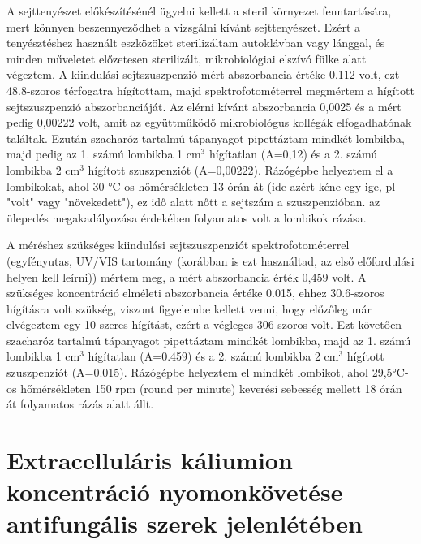 A sejttenyészet előkészítésénél ügyelni kellett a steril környezet fenntartására, mert könnyen beszennyeződhet a vizsgálni kívánt sejttenyészet. Ezért a tenyésztéshez használt eszközöket sterilizáltam autoklávban vagy lánggal, és minden műveletet előzetesen sterilizált, mikrobiológiai elszívó fülke alatt végeztem. A kiindulási sejtszuszpenzió mért abszorbancia értéke 0.112 volt, ezt 48.8-szoros térfogatra hígítottam, majd spektrofotométerrel megmértem a hígított sejtszuszpenzió abszorbanciáját. Az elérni kívánt abszorbancia 0,0025 és a mért pedig 0,00222 volt, amit az együttműködő mikrobiológus kollégák elfogadhatónak találtak. Ezután szacharóz tartalmú tápanyagot pipettáztam mindkét lombikba, majd pedig az 1. számú lombikba 1 cm$^3$ hígítatlan (A=0,12) és a 2. számú lombikba 2 cm$^3$ hígított szuszpenziót (A=0,00222). Rázógépbe helyeztem el a lombikokat, ahol 30 °C-os hőmérsékleten 13 órán át (ide azért kéne egy ige, pl "volt" vagy "növekedett"), ez idő alatt nőtt a sejtszám a szuszpenzióban. az ülepedés megakadályozása érdekében folyamatos volt a lombikok rázása. 

A méréshez szükséges kiindulási sejtszuszpenziót spektrofotométerrel (egyfényutas, UV/VIS tartomány (korábban is ezt használtad, az első előfordulási helyen kell leírni)) mértem meg, a mért abszorbancia érték 0,459 volt. A szükséges koncentráció elméleti abszorbancia értéke 0.015, ehhez 30.6-szoros hígításra volt szükség, viszont figyelembe kellett venni, hogy előzőleg már elvégeztem egy 10-szeres hígítást, ezért a végleges 306-szoros volt. Ezt követően szacharóz tartalmú tápanyagot pipettáztam mindkét lombikba, majd az 1. számú lombikba 1 cm$^3$ hígítatlan (A=0.459) és a 2. számú lombikba 2 cm$^3$ hígított szuszpenziót (A=0.015).  Rázógépbe helyeztem el mindkét lombikot, ahol 29,5°C-os hőmérsékleten 150 rpm (round per minute) keverési sebesség mellett 18 órán át folyamatos rázás alatt állt.

\section{Extracelluláris káliumion koncentráció nyomonkövetése antifungális szerek jelenlétében}

